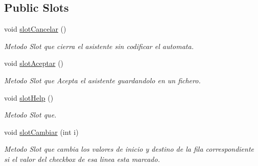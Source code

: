 \subsection*{Public Slots}
\begin{DoxyCompactItemize}
\item 
void \hyperlink{classCAsistenteCodificacion_ab7f28d6c6468d1c92a85c655892d31f2}{slot\+Cancelar} ()
\begin{DoxyCompactList}\small\item\em Metodo Slot que cierra el asistente sin codificar el automata. \end{DoxyCompactList}\item 
void \hyperlink{classCAsistenteCodificacion_a64f692a920d95d1f482d52b57d865915}{slot\+Aceptar} ()
\begin{DoxyCompactList}\small\item\em Metodo Slot que Acepta el asistente guardandolo en un fichero. \end{DoxyCompactList}\item 
void \hyperlink{classCAsistenteCodificacion_a55c2125eb7a4cd4e48647976f21ad165}{slot\+Help} ()
\begin{DoxyCompactList}\small\item\em Metodo Slot que. \end{DoxyCompactList}\item 
void \hyperlink{classCAsistenteCodificacion_ae1301ca578c8c5a8a90f26eb1a99110d}{slot\+Cambiar} (int i)
\begin{DoxyCompactList}\small\item\em Metodo Slot que cambia los valores de inicio y destino de la fila correspondiente si el valor del checkbox de esa linea esta marcado. \end{DoxyCompactList}\end{DoxyCompactItemize}
